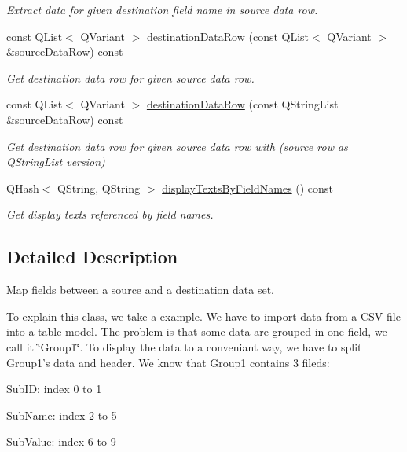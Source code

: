 \begin{DoxyCompactItemize}
\begin{DoxyCompactList}\small\item\em Extract data for given destination field name in source data row. \end{DoxyCompactList}\item 
const Q\-List$<$ Q\-Variant $>$ \hyperlink{classmdt_field_map_aef41b8ebbc6a84b4d98563d6004bd2af}{destination\-Data\-Row} (const Q\-List$<$ Q\-Variant $>$ \&source\-Data\-Row) const 
\begin{DoxyCompactList}\small\item\em Get destination data row for given source data row. \end{DoxyCompactList}\item 
const Q\-List$<$ Q\-Variant $>$ \hyperlink{classmdt_field_map_ae10f3fd5e5c38fe00e57c54edbe5600e}{destination\-Data\-Row} (const Q\-String\-List \&source\-Data\-Row) const 
\begin{DoxyCompactList}\small\item\em Get destination data row for given source data row with (source row as Q\-String\-List version) \end{DoxyCompactList}\item 
Q\-Hash$<$ Q\-String, Q\-String $>$ \hyperlink{classmdt_field_map_ad772f68130bd2e535f598b1d091a7b53}{display\-Texts\-By\-Field\-Names} () const 
\begin{DoxyCompactList}\small\item\em Get display texts referenced by field names. \end{DoxyCompactList}\end{DoxyCompactItemize}


\subsection{Detailed Description}
Map fields between a source and a destination data set. 

To explain this class, we take a example. We have to import data from a C\-S\-V file into a table model. The problem is that some data are grouped in one field, we call it \char`\"{}\-Group1\char`\"{}. To display the data to a conveniant way, we have to split Group1's data and header. We know that Group1 contains 3 fileds\-:
\begin{DoxyItemize}
\item Sub\-I\-D\-: index 0 to 1
\item Sub\-Name\-: index 2 to 5
\item Sub\-Value\-: index 6 to 9
\end{DoxyItemize}

